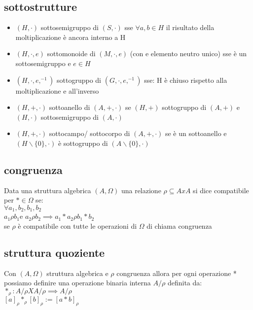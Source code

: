 \documentclass{article}
\begin{document}
\begin{multicols*}{3}
 		\subsection{sottostrutture}
 		\begin{itemize}
 			\setlength\itemsep{0.1mm}
 			\item \((H,\cdot)\) sottosemigruppo di \((S,\cdot)\) sse \(\forall a,b \in H\) il risultato della moltiplicazione è ancora interno a H 
 			\item \((H,\cdot, e)\) sottomonoide di \((M,\cdot, e)\) (con e elemento neutro unico) sse è un sottosemigruppo e \(e \in H\)
 			\item  \((H,\cdot, e, ^{-1})\) sottogruppo di \((G,\cdot, e, ^{-1})\) sse: H è chiuso rispetto alla moltiplicazione e all'inverso
 			\item \((H,+, \cdot)\) sottoanello di \((A,+, \cdot)\) se \((H,+)\) sottogruppo di \((A,+)\) e \((H,\cdot)\) sottosemigruppo di \((A,\cdot)\)
 			\item \((H,+, \cdot)\) sottocampo/ sottocorpo di \((A,+, \cdot)\) se è un sottoanello e \((H \backslash \{0\}, \cdot)\) è sottogruppo di \((A \backslash \{0\}, \cdot)\)
 		\end{itemize}
 	 	\subsection{congruenza}
 	 	Data una struttura algebrica \((A,\Omega)\) una relazione \(\rho \subseteq AxA\) si dice compatibile per \(* \in \Omega\) se:\\
 	 	\(\forall a_1,b_2,b_1,b_2\)\\ \(a_1 \rho b_1 \)e \(a_2 \rho b_2 \implies a_1 * a_2 \rho b_1 * b_2\)\\
 	 	se \(\rho\) è compatibile con tutte le operazioni di \(\Omega\) di chiama congruenza
 	 	\subsection{struttura quoziente}
 	 	Con \((A, \Omega)\) struttura algebrica e \(\rho\) congruenza allora per ogni operazione * possiamo definire una operazione binaria interna \(A/\rho\) definita da:\\
 	 	\(*_\rho: A/\rho X A/\rho \implies A/\rho\)\\
 	 	\([a]_\rho *_\rho [b]_\rho := [a*b]_\rho \)

\end{multicols*}
\end{document}
